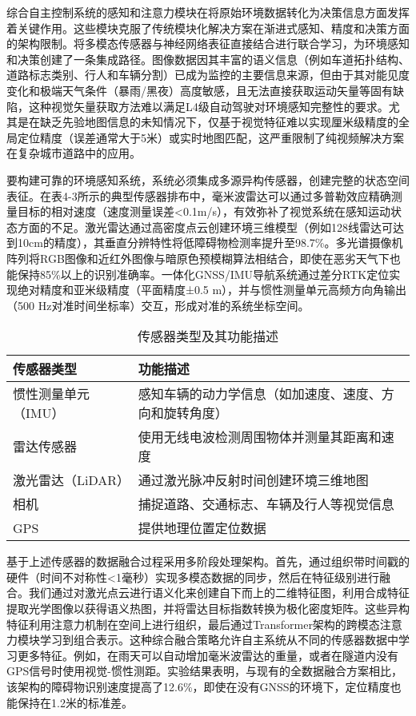 综合自主控制系统的感知和注意力模块在将原始环境数据转化为决策信息方面发挥着关键作用。这些模块克服了传统模块化解决方案在渐进式感知、精度和决策方面的架构限制。将多模态传感器与神经网络表征直接结合进行联合学习，为环境感知和决策创建了一条集成路径。图像数据因其丰富的语义信息（例如车道拓扑结构、道路标志类别、行人和车辆分割）已成为监控的主要信息来源，但由于其对能见度变化和极端天气条件（暴雨/黑夜）高度敏感，且无法直接获取运动矢量等固有缺陷，这种视觉矢量获取方法难以满足L4级自动驾驶对环境感知完整性的要求。尤其是在缺乏先验地图信息的未知情况下，仅基于视觉特征难以实现厘米级精度的全局定位精度（误差通常大于5米）或实时地图匹配，这严重限制了纯视频解决方案在复杂城市道路中的应用。

要构建可靠的环境感知系统，系统必须集成多源异构传感器，创建完整的状态空间表征。在表4-3所示的典型传感器排布中，毫米波雷达可以通过多普勒效应精确测量目标的相对速度（速度测量误差<0.1m/s），有效弥补了视觉系统在感知运动状态方面的不足。激光雷达通过高密度点云创建环境三维模型（例如128线雷达可达到10cm的精度），其垂直分辨特性将低障碍物检测率提升至98.7\%。多光谱摄像机阵列将RGB图像和近红外图像与暗原色预模糊算法相结合，即使在恶劣天气下也能保持85\%以上的识别准确率。一体化GNSS/IMU导航系统通过差分RTK定位实现绝对精度和亚米级精度（平面精度±0.5 m），并与惯性测量单元高频方向角输出（500 Hz对准时间坐标率）交互，形成对准的系统坐标空间。


\begin{table}[htbp]
	\centering
	\caption{传感器类型及其功能描述}
	\label{tab:sensors}
	\begin{tabular}{ll}
		\toprule
		\textbf{传感器类型} & \textbf{功能描述} \\
		\midrule
		惯性测量单元（IMU） & 感知车辆的动力学信息（如加速度、速度、方向和旋转角度） \\
		雷达传感器 & 使用无线电波检测周围物体并测量其距离和速度 \\
		激光雷达（LiDAR） & 通过激光脉冲反射时间创建环境三维地图 \\
		相机 & 捕捉道路、交通标志、车辆及行人等视觉信息 \\
		GPS & 提供地理位置定位数据 \\
		\bottomrule
	\end{tabular}
\end{table}

基于上述传感器的数据融合过程采用多阶段处理架构。首先，通过组织带时间戳的硬件（时间不对称性<1毫秒）实现多模态数据的同步，然后在特征级别进行融合。我们通过对激光点云进行语义化来创建自下而上的二维特征图，利用合成特征提取光学图像以获得语义热图，并将雷达目标指数转换为极化密度矩阵。这些异构特征利用注意力机制在空间上进行组织，最后通过Transformer架构的跨模态注意力模块学习到组合表示。这种综合融合策略允许自主系统从不同的传感器数据中学习更多特征。例如，在雨天可以自动增加毫米波雷达的重量，或者在隧道内没有GPS信号时使用视觉-惯性测距。实验结果表明，与现有的全数据融合方案相比，该架构的障碍物识别速度提高了12.6\%，即使在没有GNSS的环境下，定位精度也能保持在1.2米的标准差。

